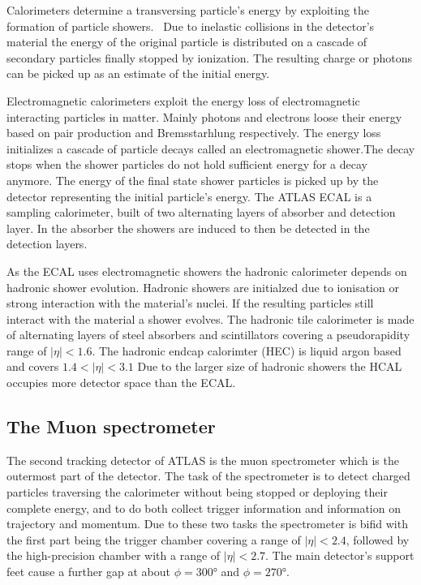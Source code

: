 Calorimeters determine a transversing particle's energy by exploiting the formation of particle showers.~\cite{wermes} Due to inelastic collisions in the detector's material the energy of the original particle is distributed on a cascade of secondary particles finally stopped by ionization. The resulting charge or photons can be picked up as an estimate of the initial energy.

Electromagnetic calorimeters exploit the energy loss of electromagnetic interacting particles in matter. Mainly photons and electrons loose their energy based on pair production and Bremsstarhlung respectively. The energy loss initializes a cascade of particle decays called an electromagnetic shower.The decay stops when the shower particles do not hold sufficient energy for a decay anymore. The energy of the final state shower particles is picked up by the detector representing the initial particle's energy.
The ATLAS ECAL is a sampling calorimeter, built of two alternating layers of absorber and detection layer. In the absorber the showers are induced to then be detected in the detection layers.


As the ECAL uses electromagnetic showers the hadronic calorimeter depends on hadronic shower evolution. Hadronic showers are initialzed due to ionisation or strong interaction with the material's nuclei. If the resulting particles still interact with the material a shower evolves.
The hadronic tile calorimeter is made of alternating layers of steel absorbers and scintillators covering a pseudorapidity range of $|\eta| < 1.6$.
The hadronic endcap calorimter (HEC) is liquid argon based and covers $1.4 < |\eta| < 3.1$
Due to the larger size of hadronic showers the HCAL occupies more detector space than the ECAL.


\subsection{The Muon spectrometer}

The second tracking detector of ATLAS is the muon spectrometer which is the outermost part of the detector. The task of the spectrometer is to detect charged particles traversing the calorimeter without being stopped or deploying their complete energy, and to do both collect trigger information and information on trajectory and momentum. Due to these two tasks the spectrometer is bifid with the first part being the trigger chamber covering a range of $|\eta|<2.4$, followed by the high-precision chamber with a range of $|\eta|<2.7$. The main detector's support feet cause a further gap at about $\phi = \ang{300}$ and $\phi = \ang{270}$.

